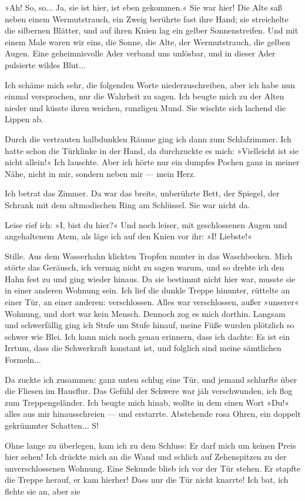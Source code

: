 »Ah! So, so... Ja, sie ist hier, ist eben gekommen.« Sie war hier!
Die Alte saß neben einem Wermutstrauch, ein Zweig berührte fast
ihre Hand; sie streichelte die silbernen Blätter, und auf ihren
Knien lag ein gelber Sonnenstreifen. Und mit einem Male waren wir
eins, die Sonne, die Alte, der Wermutstrauch, die gelben Augen.
Eine geheimnisvolle Ader verband uns unlösbar, und in dieser Ader
pulsierte wildes Blut...

Ich schäme mich sehr, die folgenden Worte niederzuschreiben, aber
ich habe nun einmal versprochen, nur die Wahrheit zu sagen. Ich
beugte mich zu der Alten nieder und küsste ihren weichen, runzligen
Mund. Sie wischte sich lachend die Lippen ab.

Durch die vertrauten halbdunklen Räume ging ich dann zum
Schlafzimmer. Ich hatte schon die Türklinke in der Hand, da
durchzuckte es mich: »Vielleicht ist sie nicht allein!« Ich
lauschte. Aber ich hörte nur ein dumpfes Pochen ganz in meiner
Nähe, nicht in mir, sondern neben mir — mein Herz.

Ich betrat das Zimmer. Da war das breite, unberührte Bett, der
Spiegel, der Schrank mit dem altmodischen Ring am Schlüssel. Sie
war nicht da.

Leise rief ich: »I, bist du hier?« Und noch leiser, mit
geschlossenen Augen und angehaltenem Atem, als läge ich auf den
Knien vor ihr: »I! Liebste!«

Stille. Aus dem Wasserhahn klickten Tropfen munter in das
Waschbecken. Mich störte das Geräusch, ich vermag nicht zu sagen
warum, und so drehte ich den Hahn fest zu und ging wieder hinaus.
Da sie bestimmt nicht hier war, musste sie in einer anderen Wohnung
sein. Ich lief die dunkle Treppe hinunter, rüttelte an einer Tür,
an einer anderen: verschlossen. Alles war verschlossen, außer
»unserer« Wohnung, und dort war kein Mensch. Dennoch zog es mich
dorthin. Langsam und schwerfällig ging ich Stufe um Stufe hinauf,
meine Füße wurden plötzlich so schwer wie Blei. Ich kann mich noch
genau erinnern, dass ich dachte: Es ist ein Irrtum, dass die
Schwerkraft konstant ist, und folglich sind meine sämtlichen
Formeln...

Da zuckte ich zusammen: ganz unten schlug eine Tür, und jemand
schlurfte über die Fliesen im Hausflur. Das Gefühl der Schwere war
jäh verschwunden, ich flog zum Treppengeländer. Ich beugte mich
hinab, wollte in dem einen Wort »Du!« alles aus mir hinausschreien
— und erstarrte. Abstehende rosa Ohren, ein doppelt gekrümmter
Schatten... S!

Ohne lange zu überlegen, kam ich zu dem Schluss: Er darf mich um
keinen Preis hier sehen! Ich drückte mich an die Wand und schlich
auf Zehenspitzen zu der unverschlossenen Wohnung. Eine Sekunde
blieb ich vor der Tür stehen. Er stapfte die Treppe herauf, er kam
hierher! Dass nur die Tür nicht knarrte! Ich bat, ich flehte sie
an, aber sie

